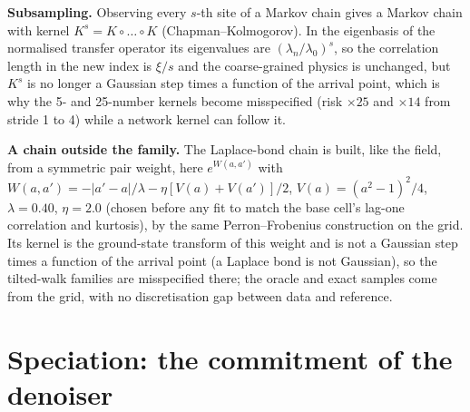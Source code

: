 \textbf{Subsampling.} Observing every $s$-th site of a Markov chain gives a Markov chain with kernel $K^s=K\circ\dots\circ K$ (Chapman--Kolmogorov). In the eigenbasis of the normalised transfer operator its eigenvalues are $(\lambda_n/\lambda_0)^s$, so the correlation length in the new index is $\xi/s$ and the coarse-grained physics is unchanged, but $K^s$ is no longer a Gaussian step times a function of the arrival point,
which is why the 5- and 25-number kernels become misspecified (risk $\times25$ and $\times14$ from stride 1 to 4) while a network kernel can follow it.

\textbf{A chain outside the family.} The Laplace-bond chain is built, like the field, from a symmetric pair weight, here $e^{W(a,a')}$ with $W(a,a')=-|a'-a|/\lambda-\eta[V(a)+V(a')]/2$, $V(a)=(a^2-1)^2/4$, $\lambda=0.40$, $\eta=2.0$ (chosen before any fit to match the base cell's lag-one correlation and kurtosis), by the same Perron--Frobenius construction on the grid. Its kernel is the ground-state transform of this weight and is not a Gaussian step
times a function of the arrival point (a Laplace bond is not Gaussian), so the tilted-walk families are misspecified there; the oracle and exact samples come from the grid, with no discretisation gap between data and reference.

\section{Speciation: the commitment of the denoiser}

